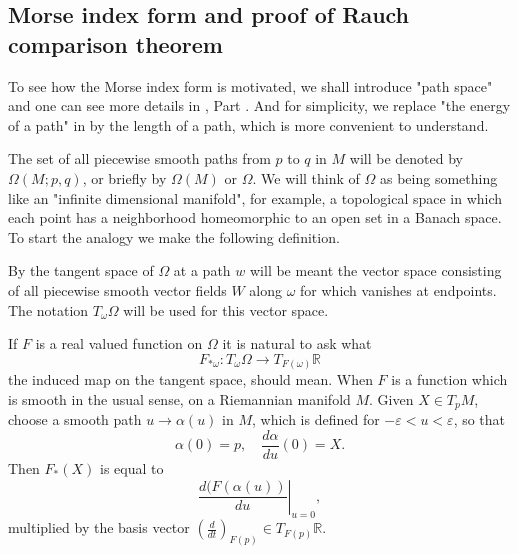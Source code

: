 \documentclass{ctexart}
\begin{document}

\subsection*{Morse index form and proof of Rauch comparison theorem}

To see how the Morse index form is motivated, we shall introduce "path space" and one can see more details in \cite{Milnor1973}, Part \uppercase\expandafter{}. 
And for simplicity, we replace "the energy of a path" in \cite{Milnor1973} by the length of a path, which is more convenient to understand.

The set of all piecewise smooth paths from $p$ to $q$ in $M$ will be denoted by $\Omega(M ; p, q)$, or briefly by $\Omega(M)$ or $\Omega$.
We will think of $\Omega$ as being something like an "infinite dimensional manifold", for example, a topological space in which each point has a neighborhood 
homeomorphic to an open set in a Banach space. To start the analogy we make the following definition.

By the tangent space of $\Omega$ at a path $w$ will be meant the vector space consisting of all piecewise smooth vector fields $W$ along $\omega$ for which vanishes 
at endpoints. The notation $T_\omega \Omega$ will be used for this vector space.

If $F$ is a real valued function on $\Omega$ it is natural to ask what
$$
F_{*\omega}: T_\omega \Omega \rightarrow T_{F(\omega)} \mathbb{R}
$$
the induced map on the tangent space, should mean. When $F$ is a function which is smooth in the usual sense, on a Riemannian manifold $M$. 
Given $X \in T_p M$, choose a smooth path $u \rightarrow \alpha(u)$ in $M$, which is defined for $-\varepsilon<u<\varepsilon$, so that
$$
\alpha(0)=p, \quad \frac{d \alpha}{d u}(0)=X. 
$$
Then $F_*(X)$ is equal to 
$$
\left.\frac{d(F(\alpha(u))}{d u}\right|_{u=0},
$$
multiplied by the basis vector $\left(\frac{d}{d t}\right)_{F(p)} \in T_{F(p)}\mathbb{R}$. 
\end{document}
